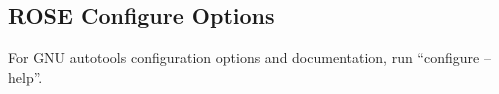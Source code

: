 \subsection{ROSE Configure Options}
\label{gettingStarted:configureOptions}

     For GNU autotools configuration options and documentation, run
     ``configure --help''.


